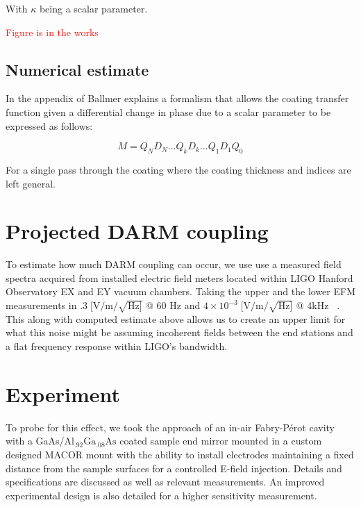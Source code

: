 With $\kappa$ being a scalar parameter.


\textcolor{red}{Figure is in the works}

\subsection{Numerical estimate}

In the appendix of \cite{ballmer2015} Ballmer explains a formalism that allows the coating transfer function given a differential change in phase due to a scalar parameter to be expressed as follows:

\begin{equation}
M = Q_N D_N ...Q_kD_k...Q_1D_1Q_0
\end{equation}

For a single pass through the coating where the coating thickness and indices are left general.


\section{Projected DARM coupling}
To estimate how much DARM coupling can occur, we use use a measured field spectra acquired from installed electric field meters located within LIGO Hanford Observatory EX and EY vacuum chambers. Taking the upper and the lower EFM measurements in $.3\; [\mathrm{V}/\mathrm{m}/\sqrt{\mathrm{Hz}]}$ @ 60 Hz and $4\times10^{-3}\; [\mathrm{V}/\mathrm{m}/\sqrt{\mathrm{Hz}]}$ @ 4kHz ~\cite{efm_log}.
This along with computed estimate above allows us to create an upper limit for what this noise might be assuming incoherent fields between the end stations and a flat frequency response within LIGO's bandwidth.

\section{Experiment}
To probe for this effect, we took the approach of an in-air Fabry-P\'{e}rot cavity with a GaAs/$\mathrm{Al_{.92}Ga_{.08}As}$ coated sample end mirror mounted in a custom designed MACOR mount with the ability to install electrodes maintaining a fixed distance from the sample surfaces for a controlled E-field injection. Details and specifications are discussed as well as relevant measurements. An improved experimental design is also detailed for a higher sensitivity measurement.


